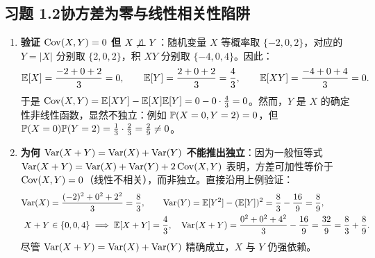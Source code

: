 \subsection*{习题 1.2\quad 协方差为零与线性相关性陷阱}
\begin{enumerate}[label=(\arabic*), leftmargin=1.8em]
  \item \textbf{验证 $\operatorname{Cov}(X, Y) = 0$ 但 $X \not\perp\!\!\!\perp Y$}：随机变量 $X$ 等概率取 $\{-2, 0, 2\}$，对应的 $Y = |X|$ 分别取 $\{2, 0, 2\}$，积 $XY$ 分别取 $\{-4, 0, 4\}$。因此：
  \[
    \mathbb{E}[X] = \frac{-2 + 0 + 2}{3} = 0, \qquad
    \mathbb{E}[Y] = \frac{2 + 0 + 2}{3} = \frac{4}{3}, \qquad
    \mathbb{E}[XY] = \frac{-4 + 0 + 4}{3} = 0.
  \]
  于是 $\operatorname{Cov}(X, Y) = \mathbb{E}[XY] - \mathbb{E}[X]\mathbb{E}[Y] = 0 - 0\cdot \frac{4}{3} = 0$。然而，$Y$ 是 $X$ 的确定性非线性函数，显然不独立：例如 $\mathbb{P}(X = 0, Y = 2) = 0$，但 $\mathbb{P}(X = 0)\mathbb{P}(Y = 2) = \frac{1}{3} \cdot \frac{2}{3} = \frac{2}{9} \neq 0$。
  \item \textbf{为何 $\operatorname{Var}(X+Y) = \operatorname{Var}(X) + \operatorname{Var}(Y)$ 不能推出独立}：因为一般恒等式 $\operatorname{Var}(X+Y) = \operatorname{Var}(X) + \operatorname{Var}(Y) + 2\operatorname{Cov}(X, Y)$ 表明，方差可加性等价于 $\operatorname{Cov}(X, Y) = 0$（线性不相关），而非独立。直接沿用上例验证：
  \begin{align*}
    \operatorname{Var}(X) &= \frac{(-2)^2 + 0^2 + 2^2}{3} = \frac{8}{3}, \qquad
    \operatorname{Var}(Y) = \mathbb{E}[Y^2] - (\mathbb{E}[Y])^2 = \frac{8}{3} - \frac{16}{9} = \frac{8}{9}, \\
    X + Y &\in \{0, 0, 4\} \implies \mathbb{E}[X+Y] = \frac{4}{3},\quad
    \operatorname{Var}(X+Y) = \frac{0^2 + 0^2 + 4^2}{3} - \frac{16}{9} = \frac{32}{9} = \frac{8}{3} + \frac{8}{9}.
  \end{align*}
  尽管 $\operatorname{Var}(X+Y) = \operatorname{Var}(X) + \operatorname{Var}(Y)$ 精确成立，$X$ 与 $Y$ 仍强依赖。
\end{enumerate}

